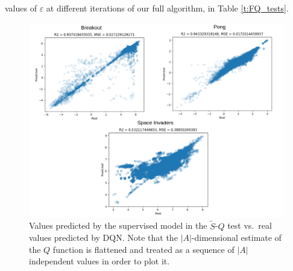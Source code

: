values of $\varepsilon$ at different iterations of our full algorithm, in 
Table \ref{t:FQ_tests}.
%
\begin{figure}
    \includegraphics[width=\textwidth]{pictures/experiments/FQ_test_all_three}
    \centering
    \caption[Predictions of $\tilde{S}$-$Q$ mapping experiment]{Values predicted 
	     by the supervised model in the $\tilde{S}$-$Q$ test vs.\ real 
	     values predicted by DQN. Note that the $|A|$-dimensional estimate 
	     of the $Q$ function is flattened and treated as a sequence of 
	     $|A|$ independent values in order to plot it.}
    \label{f:FQ_test_all_three}
\end{figure}
%


